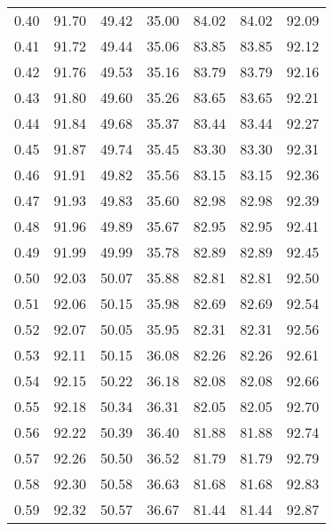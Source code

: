 \begin{tabular}{|c|c|c|c|c|c|c|}
      0.40 &     91.70 &     49.42 &      35.00 &   84.02 &      84.02 &         92.09 \\
      0.41 &     91.72 &     49.44 &      35.06 &   83.85 &      83.85 &         92.12 \\
      0.42 &     91.76 &     49.53 &      35.16 &   83.79 &      83.79 &         92.16 \\
      0.43 &     91.80 &     49.60 &      35.26 &   83.65 &      83.65 &         92.21 \\
      0.44 &     91.84 &     49.68 &      35.37 &   83.44 &      83.44 &         92.27 \\
      0.45 &     91.87 &     49.74 &      35.45 &   83.30 &      83.30 &         92.31 \\
      0.46 &     91.91 &     49.82 &      35.56 &   83.15 &      83.15 &         92.36 \\
      0.47 &     91.93 &     49.83 &      35.60 &   82.98 &      82.98 &         92.39 \\
      0.48 &     91.96 &     49.89 &      35.67 &   82.95 &      82.95 &         92.41 \\
      0.49 &     91.99 &     49.99 &      35.78 &   82.89 &      82.89 &         92.45 \\
      0.50 &     92.03 &     50.07 &      35.88 &   82.81 &      82.81 &         92.50 \\
      0.51 &     92.06 &     50.15 &      35.98 &   82.69 &      82.69 &         92.54 \\
      0.52 &     92.07 &     50.05 &      35.95 &   82.31 &      82.31 &         92.56 \\
      0.53 &     92.11 &     50.15 &      36.08 &   82.26 &      82.26 &         92.61 \\
      0.54 &     92.15 &     50.22 &      36.18 &   82.08 &      82.08 &         92.66 \\
      0.55 &     92.18 &     50.34 &      36.31 &   82.05 &      82.05 &         92.70 \\
      0.56 &     92.22 &     50.39 &      36.40 &   81.88 &      81.88 &         92.74 \\
      0.57 &     92.26 &     50.50 &      36.52 &   81.79 &      81.79 &         92.79 \\
      0.58 &     92.30 &     50.58 &      36.63 &   81.68 &      81.68 &         92.83 \\
      0.59 &     92.32 &     50.57 &      36.67 &   81.44 &      81.44 &         92.87 \\

\end{tabular}

